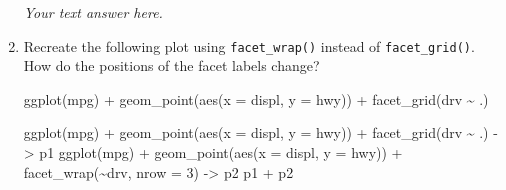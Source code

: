 \documentclass[
  letterpaper,
  DIV=11,
  numbers=noendperiod]{scrreprt}
\newenvironment{Shaded}{\begin{snugshade}}{\end{snugshade}}
\newcommand{\AttributeTok}[1]{\textcolor[rgb]{0.40,0.45,0.13}{#1}}
\newcommand{\DecValTok}[1]{\textcolor[rgb]{0.68,0.00,0.00}{#1}}
\newcommand{\FunctionTok}[1]{\textcolor[rgb]{0.28,0.35,0.67}{#1}}
\newcommand{\NormalTok}[1]{\textcolor[rgb]{0.00,0.23,0.31}{#1}}
\newcommand{\OtherTok}[1]{\textcolor[rgb]{0.00,0.23,0.31}{#1}}
\newcommand{\SpecialCharTok}[1]{\textcolor[rgb]{0.37,0.37,0.37}{#1}}
\begin{document}
\begin{enumerate}
\begin{tcolorbox}
\begin{figure}[H]
  \end{figure}

  \emph{Your text answer here.}

  \end{tcolorbox}
\item
  Recreate the following plot using \texttt{facet\_wrap()} instead of
  \texttt{facet\_grid()}. How do the positions of the facet labels
  change?

\begin{Shaded}
\begin{Highlighting}[]
\FunctionTok{ggplot}\NormalTok{(mpg) }\SpecialCharTok{+} 
  \FunctionTok{geom\_point}\NormalTok{(}\FunctionTok{aes}\NormalTok{(}\AttributeTok{x =}\NormalTok{ displ, }\AttributeTok{y =}\NormalTok{ hwy)) }\SpecialCharTok{+}
  \FunctionTok{facet\_grid}\NormalTok{(drv }\SpecialCharTok{\textasciitilde{}}\NormalTok{ .)}
\end{Highlighting}
\end{Shaded}

  \begin{tcolorbox}[enhanced jigsaw, left=2mm, rightrule=.15mm, bottomtitle=1mm, opacitybacktitle=0.6, leftrule=.75mm, opacityback=0, colframe=quarto-callout-note-color-frame, bottomrule=.15mm, coltitle=black, toptitle=1mm, colback=white, titlerule=0mm, colbacktitle=quarto-callout-note-color!10!white, title={Answer}, toprule=.15mm, breakable, arc=.35mm]

\begin{Shaded}
\begin{Highlighting}[]
\FunctionTok{ggplot}\NormalTok{(mpg) }\SpecialCharTok{+} 
  \FunctionTok{geom\_point}\NormalTok{(}\FunctionTok{aes}\NormalTok{(}\AttributeTok{x =}\NormalTok{ displ, }\AttributeTok{y =}\NormalTok{ hwy)) }\SpecialCharTok{+}
  \FunctionTok{facet\_grid}\NormalTok{(drv }\SpecialCharTok{\textasciitilde{}}\NormalTok{ .) }\OtherTok{{-}\textgreater{}}\NormalTok{ p1}
\FunctionTok{ggplot}\NormalTok{(mpg) }\SpecialCharTok{+} 
  \FunctionTok{geom\_point}\NormalTok{(}\FunctionTok{aes}\NormalTok{(}\AttributeTok{x =}\NormalTok{ displ, }\AttributeTok{y =}\NormalTok{ hwy)) }\SpecialCharTok{+}
  \FunctionTok{facet\_wrap}\NormalTok{(}\SpecialCharTok{\textasciitilde{}}\NormalTok{drv, }\AttributeTok{nrow =} \DecValTok{3}\NormalTok{) }\OtherTok{{-}\textgreater{}}\NormalTok{ p2}
\NormalTok{p1 }\SpecialCharTok{+}\NormalTok{ p2}
\end{Highlighting}
\end{Shaded}

  \begin{figure}[H]


\end{figure}
\end{tcolorbox}
\end{enumerate}
\end{document}
